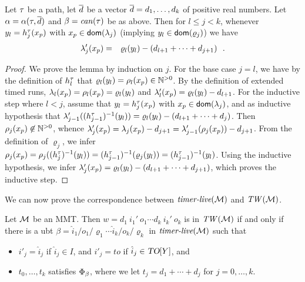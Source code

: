 \begin{lemma}
  \label{lem:timerval}
  Let $\tau$ be a path, let $\overline{d}$ be a vector $\overline{d} = d_1, \ldots, d_k$
  of positive real numbers. 
  Let $\alpha = \alpha(\tau,\overline{d})$ and $\beta = \mathit{can}({\tau})$ be as above.
  Then 
for $l \leq j < k$,
whenever 
$y_l = h_{j}^{\tau}(x_p)$ with $x_p \in {\textsf{dom}}(\lambda_j)$ 
(implying $y_l \in {\textsf{dom}}(\varrho_{j})$) we have
\begin{eqnarray*}
 \lambda_{j}'(x_p) & = &  \varrho_l(y_l) - (d_{l+1} + \cdots + d_{j+1})
 \ \ .
\end{eqnarray*}
\end{lemma}

\begin{proof}
We prove the lemma by induction on $j$.
  For the base case $j = l$, we have
 by the definition of $h_{l}^{\tau}$ that
 $\varrho_l(y_l) = \rho_l(x_p) \in {\mathbb N}^{>0}$. By the definition of extended timed runs,
 $\lambda_l(x_p) =  \rho_l(x_p) = \varrho_l(y_l)$ and
 $\lambda_l'(x_p) =  \varrho_l(y_l) - d_{l+1}$.
 For the inductive step where $l < j$, assume that
 $y_l = h_{j}^{\tau}(x_p)$ with $x_p \in {\textsf{dom}}(\lambda_j)$, and
 as inductive hypothesis that
 $\lambda_{j-1}'((h_{j-1}^{\tau})^{-1}(y_l)) =
 \varrho_l(y_l) - (d_{l+1} + \cdots + d_{j})$.
 Then $\rho_{j}(x_p) \not\in {\mathbb N}^{>0}$, whence
 $\lambda_{j}'(x_p) =  \lambda_{j}(x_p) -d_{j+1} = 
 \lambda_{j-1}'(\rho_{j}(x_p)) - d_{j+1}$.
 From the definition of $\varrho_{j}$, we infer
 $\rho_{j}(x_p) = \rho_{j}((h_{j}^{\tau})^{-1}(y_l)) =
 (h_{j-1}^{\tau})^{-1}(\varrho_{j}(y_l)) =
 (h_{j-1}^{\tau})^{-1}(y_l)$. Using the inductive hypothesis, we infer
 $\lambda_{j}'(x_p) =
 \varrho_l(y_l) - (d_{l+1} + \cdots + d_{j+1})$, which proves the inductive
 step.
\end{proof}

We can now prove the correspondence between $\mbox{\it timer-live}({{\mathcal M}})$ and
$\mathit{TW}({\mathcal M})$.

\begin{theorem}
\label{thm:characterization}
Let ${\mathcal M}$ be an MMT. 
Then $w =  d_1 ~ i_1' ~ o_1 \cdots d_k ~ i_k' ~ o_k$ is in $\mathit{TW}({\mathcal M})$
if and only if there is a ubt
$\beta = {\hat{i}_1/o_1/\varrho_1}  \cdots {\hat{i}_k/o_k/\varrho_k}$ in $\mbox{\it timer-live}({{\mathcal M}})$
such that
\begin{itemize}
\item
  $i'_j   =   \hat{i}_j$ if $\hat{i}_j \in I$, and
  $i'_j   = \mathit{to}$ if $\hat{i}_j \in \mbox{\sl TO}[Y]$, and
\item
$t_0, \ldots, t_k$ satisfies $\Phi_{\beta}$, where we let
$t_j = d_1 + \cdots + d_j$ for $j = 0 , \ldots, k$.
\end{itemize}
\end{theorem}

